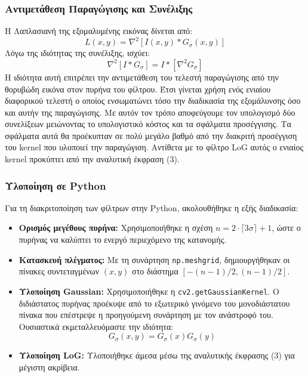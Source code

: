 \documentclass[12pt,a4paper]{article}
\begin{document}
\subsubsection*{Αντιμετάθεση Παραγώγισης και Συνέλιξης}
Η Λαπλασιανή της εξομαλυμένης εικόνας δίνεται από:
\begin{equation}
L(x,y) = \nabla^2 [I(x,y) * G_\sigma(x,y)]
\end{equation}
Λόγω της ιδιότητας της συνέλιξης, ισχύει:
\begin{equation}
\nabla^2 [I * G_\sigma] = I * [\nabla^2 G_\sigma]
\end{equation}
\hspace{0.6cm}Η ιδιότητα αυτή επιτρέπει την αντιμετάθεση του τελεστή παραγώγισης από την θορυβώδη εικόνα στον πυρήνα του φίλτρου. Έτσι γίνεται χρήση ενός ενιαίου διαφορικού τελεστή ο οποίος ενσωματώνει τόσο την διαδικασία της εξομάλυνσης όσο και αυτήν της παραγώγισης. Με αυτόν τον τρόπο αποφεύγουμε τον υπολογισμό δύο συνελίξεων μειώνοντας το υπολογιστικό κόστος και τα σφάλματα προσέγγισης. Τα σφάλματα αυτά θα προέκυπταν σε πολύ μεγάλο βαθμό από την διακριτή προσέγγιση του  \foreignlanguage{english}{kernel} που υλοποιεί την παραγώγιση. Αντίθετα με το φίλτρο  \foreignlanguage{english}{LoG} αυτός ο ενιαίος  \foreignlanguage{english}{kernel} προκύπτει από την αναλυτική έκφραση (3).

\subsubsection*{Υλοποίηση σε \foreignlanguage{english}{Python}}
Για τη διακριτοποίηση των φίλτρων στην \foreignlanguage{english}{Python}, ακολουθήθηκε η εξής διαδικασία:
\begin{itemize}
    \item \textbf{Ορισμός μεγέθους πυρήνα:} Χρησιμοποιήθηκε η σχέση $n = 2 \cdot \lceil 3\sigma \rceil + 1$, ώστε ο πυρήνας να καλύπτει το ενεργό περιεχόμενο της κατανομής.
    \item \textbf{Κατασκευή πλέγματος:} Με τη συνάρτηση \texttt{\foreignlanguage{english}{np.meshgrid}}, δημιουργήθηκαν οι πίνακες συντεταγμένων $(x,y)$ στο διάστημα $[-(n-1)/2, (n-1)/2]$.
    \item \textbf{Υλοποίηση \foreignlanguage{english}{Gaussian}:} Χρησιμοποιήθηκε η \texttt{\foreignlanguage{english}{cv2.getGaussianKernel}}. Ο διδιάστατος πυρήνας προέκυψε από το εξωτερικό γινόμενο του μονοδιάστατου πίνακα που επέστρεψε η προηγούμενη συνάρτηση με τον ανάστροφό του. Ουσιαστικά εκμεταλλευόμαστε την ιδιότητα:
    \begin{equation}
    G_\sigma(x,y) = G_\sigma(x)G_\sigma(y)
    \end{equation}
    \item \textbf{Υλοποίηση \foreignlanguage{english}{LoG}:} Υλοποιήθηκε άμεσα μέσω της αναλυτικής έκφρασης (3) για μέγιστη ακρίβεια.
\end{itemize}
\end{document}

